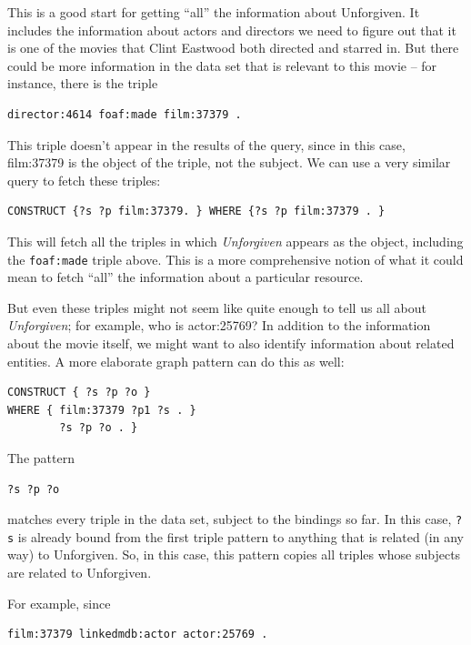 \begin{challenge}
This is a good start for getting ``all'' the information about
Unforgiven. It includes the information about actors and directors we
need to figure out that it is one of the movies that Clint Eastwood both
directed and starred in. But there could be more information in the data
set that is relevant to this movie -- for instance, there is the triple

\begin{lstlisting}
director:4614 foaf:made film:37379 .
\end{lstlisting}

This triple doesn't appear in the results of the query, since in this
case, film:37379 is the object of the triple, not the subject. We can
use a very similar query to fetch these triples:

\begin{lstlisting}
CONSTRUCT {?s ?p film:37379. } WHERE {?s ?p film:37379 . }
\end{lstlisting}

This will fetch all the triples in which \emph{Unforgiven} appears as
the object, including the \texttt{foaf:made} triple above. This is a more
comprehensive notion of what it could mean to fetch ``all'' the
information about a particular resource.

But even these triples might not seem like quite enough to tell us all
about \emph{Unforgiven}; for example, who is actor:25769? In addition to
the information about the movie itself, we might want to also identify
information about related entities. A more elaborate graph pattern can
do this as well:

\begin{lstlisting}
CONSTRUCT { ?s ?p ?o }
WHERE { film:37379 ?p1 ?s . }
        ?s ?p ?o . }
\end{lstlisting}

The pattern

\begin{lstlisting}
?s ?p ?o
\end{lstlisting}

matches every triple in the data set, subject to the bindings so far. In
this case, \texttt{?s} is already bound from the first triple pattern to anything
that is related (in any way) to Unforgiven. So, in this case, this
pattern copies all triples whose subjects are related to Unforgiven.

For example, since

\begin{lstlisting}
film:37379 linkedmdb:actor actor:25769 .
\end{lstlisting}


\end{challenge}
